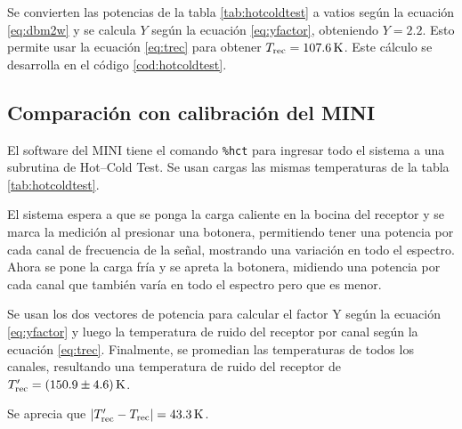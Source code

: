 Se convierten las potencias de la tabla \ref{tab:hotcoldtest} a vatios según la ecuación \ref{eq:dbm2w} y se calcula $Y$ según la ecuación \ref{eq:yfactor}, obteniendo $Y=\num{2.2}$. Esto permite usar la ecuación \ref{eq:trec} para obtener $T_\textnormal{rec}=\SI{107.6}{\kelvin}$. Este cálculo se desarrolla en el código \ref{cod:hotcoldtest}.

\subsection{Comparación con calibración del MINI}\label{sec:calibracion}

El software del MINI tiene el comando \texttt{\%hct} para ingresar todo el sistema a una subrutina de Hot--Cold Test. Se usan cargas las mismas temperaturas de la tabla \ref{tab:hotcoldtest}.

El sistema espera a que se ponga la carga caliente en la bocina del receptor y se marca la medición al presionar una botonera, permitiendo tener una potencia por cada canal de frecuencia de la señal, mostrando una variación en todo el espectro. Ahora se pone la carga fría y se apreta la botonera, midiendo una potencia por cada canal que también varía en todo el espectro pero que es menor.

Se usan los dos vectores de potencia para calcular el factor Y según la ecuación \ref{eq:yfactor} y luego la temperatura de ruido del receptor por canal según la ecuación \ref{eq:trec}. Finalmente, se promedian las temperaturas de todos los canales, resultando una temperatura de ruido del receptor de $T_\textnormal{rec}'=\SI[separate-uncertainty=true]{150.9(46)}{\kelvin}$.

Se aprecia que $\abs{T_\textnormal{rec}'-T_\textnormal{rec}}=\SI{43.3}{\kelvin}$.